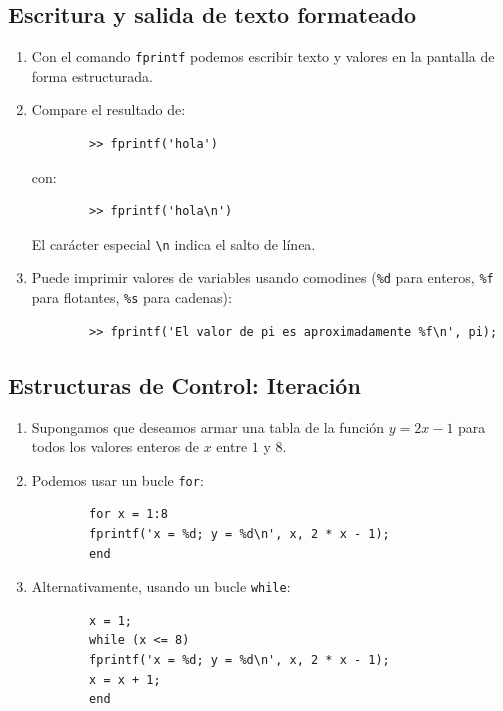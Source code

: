 \subsection{Escritura y salida de texto formateado}

\begin{enumerate}
	\item Con el comando \texttt{fprintf} podemos escribir texto y valores en la pantalla de forma estructurada.
	
	\item Compare el resultado de:
	\begin{verbatim}
		>> fprintf('hola')
	\end{verbatim}
	con:
	\begin{verbatim}
		>> fprintf('hola\n')
	\end{verbatim}
	El carácter especial \verb-\n- indica el salto de línea.
	
	\item Puede imprimir valores de variables usando comodines (\texttt{\%d} para enteros, \texttt{\%f} para flotantes, \texttt{\%s} para cadenas):
	\begin{verbatim}
		>> fprintf('El valor de pi es aproximadamente %f\n', pi);
	\end{verbatim}
\end{enumerate}

\subsection{Estructuras de Control: Iteración}

\begin{enumerate}
	\item Supongamos que deseamos armar una tabla de la función $y = 2x - 1$ para todos los valores enteros de $x$ entre $1$ y $8$.
	
	\item Podemos usar un bucle \texttt{for}:
	\begin{verbatim}
		for x = 1:8
		fprintf('x = %d; y = %d\n', x, 2 * x - 1);
		end
	\end{verbatim}
	
	\item Alternativamente, usando un bucle \texttt{while}:
	\begin{verbatim}
		x = 1;
		while (x <= 8)
		fprintf('x = %d; y = %d\n', x, 2 * x - 1);
		x = x + 1; 
		end
	\end{verbatim}
\end{enumerate}

